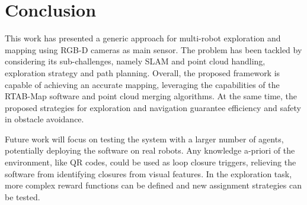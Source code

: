 \section{Conclusion}
\label{sec:conclusion}
This work has presented a generic approach for multi-robot exploration and mapping using RGB-D cameras as main sensor. The problem has been tackled by considering its sub-challenges, namely SLAM and point cloud handling, exploration strategy and path planning.
Overall, the proposed framework is capable of achieving an accurate mapping, leveraging the capabilities of the RTAB-Map software and point cloud merging algorithms. At the same time, the proposed strategies for exploration and navigation guarantee efficiency and safety in obstacle avoidance.

Future work will focus on testing the system with a larger number of agents, potentially deploying the software on real robots. Any knowledge a-priori of the environment, like QR codes, could be used as loop closure triggers, relieving the software from identifying closures from visual features. In the exploration task, more complex reward functions can be defined and new assignment strategies can be tested. 



